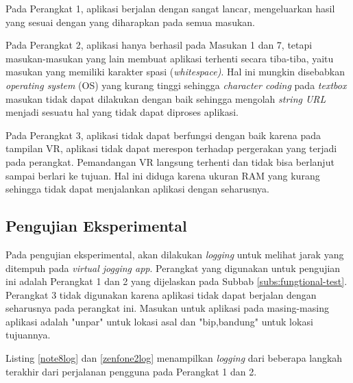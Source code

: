 Pada Perangkat 1, aplikasi berjalan dengan sangat lancar, mengeluarkan hasil yang sesuai dengan yang diharapkan pada semua masukan.

Pada Perangkat 2, aplikasi hanya berhasil pada Masukan 1 dan 7, tetapi masukan-masukan yang lain membuat aplikasi terhenti secara tiba-tiba, yaitu masukan yang memiliki karakter spasi (\textit{whitespace)}. Hal ini mungkin disebabkan \textit{operating system} (OS) yang kurang tinggi sehingga \textit{character coding} pada \textit{textbox} masukan tidak dapat dilakukan dengan baik sehingga mengolah \textit{string URL} menjadi sesuatu hal yang tidak dapat diproses aplikasi. 

Pada Perangkat 3, aplikasi tidak dapat berfungsi dengan baik karena pada tampilan VR, aplikasi tidak dapat merespon terhadap pergerakan yang terjadi pada perangkat. Pemandangan VR langsung terhenti dan tidak bisa berlanjut sampai berlari ke tujuan. Hal ini diduga karena ukuran RAM yang kurang sehingga tidak dapat menjalankan aplikasi dengan seharusnya.

\subsection{Pengujian Eksperimental}
Pada pengujian eksperimental, akan dilakukan \textit{logging} untuk melihat jarak yang ditempuh pada \textit{virtual jogging app}. Perangkat yang digunakan untuk pengujian ini adalah Perangkat 1 dan 2 yang dijelaskan pada Subbab \ref{subs:fungtional-test}. Perangkat 3 tidak digunakan karena aplikasi tidak dapat berjalan dengan seharusnya pada perangkat ini. Masukan untuk aplikasi pada masing-masing aplikasi adalah "unpar" untuk lokasi asal dan "bip,bandung" untuk lokasi tujuannya.

Listing \ref{note8log} dan \ref{zenfone2log} menampilkan \textit{logging} dari beberapa langkah terakhir dari perjalanan pengguna pada Perangkat 1 dan 2. 


